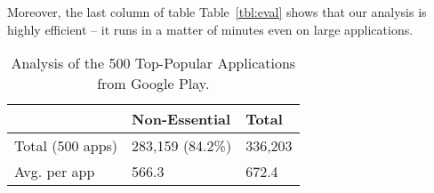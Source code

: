 Moreover, the last column of table Table~\ref{tbl:eval} shows that our analysis is highly efficient -- it runs in a matter of minutes even on large applications. 


\begin{table}[t]
\caption{Analysis of the 500 Top-Popular Applications from Google Play.}
\label{tbl:googlePlayApps}
\centering
\tabcolsep=1.5pt
\begin{tabular}{|l|C{2.8cm}|C{1.9cm}|}
\hline
                    & Non-Essential     & Total          \\ %
\hline
Total (500 apps)    & 283,159 (84.2\%)  &  336,203       \\ %
Avg. per app        &   566.3           &  672.4         \\ %
\hline
\end{tabular}
\end{table}

